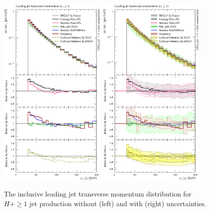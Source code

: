 \begin{figure}[t!]
  \centering
  \includegraphics[width=0.47\textwidth]{figures/hjetscomp_u_jet1_pT_incl.pdf}
  \hfill
  \includegraphics[width=0.47\textwidth]{figures/hjetscomp_jet1_pT_incl.pdf}
  \caption{
    The inclusive leading jet transverse momentum distribution for
    $H+\ge1$ jet production without (left) and with (right) uncertainties.
    \label{fig:higgscomp:results:1obs:j1pt}
  }
\end{figure}


